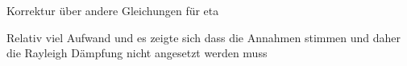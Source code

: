 \pagebreak

Korrektur über andere Gleichungen für eta

Relativ viel Aufwand und es zeigte sich dass die Annahmen stimmen und daher die Rayleigh Dämpfung nicht angesetzt werden muss